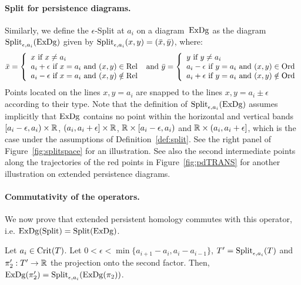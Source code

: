 \paragraph*{Split for persistence diagrams.}
Similarly, we define the $\epsilon$-Split at $a_i$ on a
diagram~$\mathrm{ExDg}$ as the diagram $\mathrm{Split}_{\epsilon,a_i}(\mathrm{ExDg})$ given by
$\mathrm{Split}_{\epsilon,a_i}(x,y)= (\bar x, \bar y)$, where:
%
\[
\bar x = \left\{\begin{array}{l}
x\ \mbox{if}\ x\neq a_i\\
a_i+\epsilon\ \mbox{if}\ 
x=a_i\ \mbox{and}\ 
(x,y)\in\Rel\\
a_i-\epsilon\ \mbox{if}\ 
x=a_i\ \mbox{and}\ 
(x,y)\notin\Rel
\end{array}\right.
\ \mbox{and}\ 
\bar y = \left\{\begin{array}{l}
y\ \mbox{if}\ y\neq a_i\\
a_i-\epsilon\ \mbox{if}\ 
y=a_i\ \mbox{and}\ 
(x,y)\in\Ord\\
a_i+\epsilon\ \mbox{if}\ 
y=a_i\ \mbox{and}\ 
(x,y)\notin\Ord
\end{array}\right.
\]
%
Points located on the lines $x,y=a_i$ are snapped to the lines
$x,y=a_i\pm\epsilon$ according to their type. Note that the definition
of $\mathrm{Split}_{\epsilon,a_i}(\mathrm{ExDg})$ assumes implicitly that $\mathrm{ExDg}$ contains no
point within the horizontal and vertical bands $[a_i-\epsilon, a_i)\times\mathbb{R}$, 
$(a_i, a_i+\epsilon]\times\mathbb{R}$, $\mathbb{R}\times [a_i-\epsilon, a_i)$ and 
$\mathbb{R}\times (a_i, a_i+\epsilon]$, which is the
case under the assumptions of Definition~\ref{def:split}.
See the right panel of Figure~\ref{fig:splitspace} for an
illustration. See also the second intermediate points along the
trajectories of the red points in Figure~\ref{fig:pdTRANS} for another
illustration on extended persistence diagrams. 

\paragraph*{Commutativity of the operators.} We now prove %
that extended persistent homology commutes with this operator, i.e.
$\mathrm{ExDg}(\mathrm{Split})=\mathrm{Split}(\mathrm{ExDg})$.

\begin{lem}
\label{lem:splitprop}
Let $a_i\in\mathrm{Crit}(T)$.
Let $0<\epsilon<\displaystyle\min\{a_{i+1}-a_i,a_i-a_{i-1}\}$, 
$T'=\mathrm{Split}_{\epsilon,a_i}(T)$ and $\pi_2':T'\rightarrow\mathbb{R}$ the projection 
onto the second factor. Then, $\mathrm{ExDg}(\pi_2')=\mathrm{Split}_{\epsilon,a_i}(\mathrm{ExDg}(\pi_2))$.
\end{lem}

